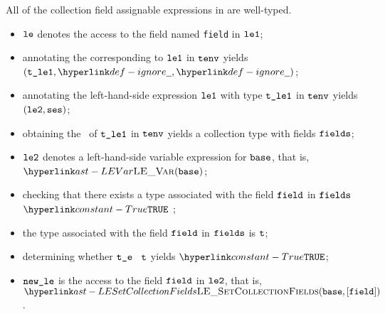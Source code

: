 

All of the collection field assignable expressions in
 are well-typed.

\ProseParagraph
\AllApply
\begin{itemize}
  \item $\texttt{le}$ denotes the access to the field named \texttt{field} in
    $\texttt{le1}$;
  \item annotating the \rhsexpression{} corresponding to $\texttt{le1}$
    in $\texttt{tenv}$ yields \\ $(\vtleone, \Ignore, \Ignore)$\ProseOrTypeError;
  \item annotating the left-hand-side expression  $\texttt{le1}$ with type
    $\texttt{t\_le1}$ in $\texttt{tenv}$ yields \\ $(\texttt{le2}, \texttt{ses})$\ProseOrTypeError;
  \item obtaining the \underlyingtype\ of $\texttt{t\_le1}$ in $\texttt{tenv}$ yields a
    collection type with fields $\texttt{fields}$\ProseOrTypeError;
  \item $\texttt{le2}$ denotes a left-hand-side variable expression for $\texttt{base}$,
    that is, $\LEVar(\vbase)$;
  \item checking that there exists a type associated with the field $\texttt{field}$
    in $\texttt{fields}$ $\True$ \ProseTerminateAs{\BadField};
  \item the type associated with the field $\texttt{field}$ in $\texttt{fields}$ is $\texttt{t}$;
  \item determining whether $\texttt{t\_e}$ \typesatisfies\ $\texttt{t}$ yields
    $\True$\ProseOrTypeError;
  \item $\texttt{new\_le}$ is the access to the field $\texttt{field}$ in $\texttt{le2}$, that is,
    $\LESetCollectionFields(\vbase, [\vfield])$.
\end{itemize}

